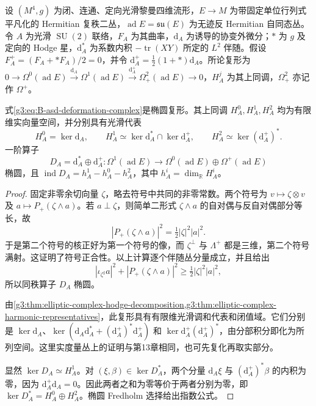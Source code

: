 \begin{proposition}\label{g3:prop:B-asd-elliptic-complex}
	设 \((M^4,g)\) 为闭、连通、定向光滑黎曼四维流形，\(E\to M\) 为带固定单位行列式平凡化的 Hermitian 复秩二丛，\(\operatorname{ad}E=\mathfrak{su}(E)\) 为无迹反 Hermitian 自同态丛。
	令 \(A\) 为光滑 \(\operatorname{SU}(2)\) 联络，\(F_A\) 为其曲率，\(\mathrm d_A\) 为诱导的协变外微分；\(*\) 为 \(g\) 及定向的 Hodge 星，\(\mathrm d_A^*\) 为系数内积 \(-\operatorname{tr}(XY)\) 所定的 \(L^2\) 伴随。假设 \(F_A^+=(F_A+*F_A)/2=0\)，并令 \(\mathrm d_A^+=\tfrac12(1+*)\mathrm d_A\)。所论复形为 \(0\to\Omega^0(\operatorname{ad}E)\xrightarrow{\mathrm d_A}\Omega^1(\operatorname{ad}E)\xrightarrow{\mathrm d_A^+}\Omega^2_+(\operatorname{ad}E)\to0\)，\(H_A^j\) 为其上同调，\(\Omega^2_+\) 亦记作 \(\Omega^+\)。

 式\eqref{g3:eq:B-asd-deformation-complex}是椭圆复形。其上同调 \(H_A^0,H_A^1,H_A^2\) 均为有限维实向量空间，并分别具有光滑代表
 \[
  H_A^0=\ker \mathrm d_A,
  \qquad H_A^1\simeq\ker \mathrm d_A^*\cap\ker \mathrm d_A^+,
  \qquad H_A^2\simeq\ker(\mathrm d_A^+)^*.
 \]
 一阶算子
 \[
  D_A=\mathrm d_A^*\oplus \mathrm d_A^+
  \colon\Omega^1(\operatorname{ad}E)
  \longrightarrow\Omega^0(\operatorname{ad}E)\oplus\Omega^+(\operatorname{ad}E)
 \]
 椭圆，且 \(\operatorname{ind}D_A=h_A^1-h_A^0-h_A^2\)，其中 \(h_A^i=\dim_{\mathbb R}H_A^i\)。
\end{proposition}
\begin{proof}
 固定非零余切向量 \(\zeta\)，略去符号中共同的非零常数。两个符号为
 \(v\mapsto\zeta\otimes v\) 及 \(a\mapsto P_+(\zeta\wedge a)\)。若 \(a\perp\zeta\)，则简单二形式 \(\zeta\wedge a\) 的自对偶与反自对偶部分等长，故
 \[
  |P_+(\zeta\wedge a)|^2=\tfrac12|\zeta|^2|a|^2.
 \]
 于是第二个符号的核正好为第一个符号的像，而 \(\zeta^\perp\) 与 \(\Lambda^+\) 都是三维，第二个符号满射。这证明了符号正合性。以上计算逐个伴随丛分量成立，并且给出
 \[
  |\iota_{\zeta^\sharp}a|^2+|P_+(\zeta\wedge a)|^2
  \ge\tfrac12|\zeta|^2|a|^2,
 \]
 所以同秩算子 \(D_A\) 椭圆。

 由\cref{g3:thm:elliptic-complex-hodge-decomposition,g3:thm:elliptic-complex-harmonic-representatives}，此复形具有有限维光滑调和代表和闭值域。它们分别是
 \(\ker \mathrm d_A\)、\(\ker(\mathrm d_A\mathrm d_A^*+(\mathrm d_A^+)^*\mathrm d_A^+)\) 和 \(\ker \mathrm d_A^+(\mathrm d_A^+)^*\)，由分部积分即化为所列空间。这里实度量丛上的证明与第13章相同，也可先复化再取实部分。

 显然 \(\ker D_A\simeq H_A^1\)。对 \((\xi,\beta)\in\ker D_A^*\)，两个分量 \(\mathrm d_A\xi\) 与 \((\mathrm d_A^+)^*\beta\) 的内积为零，因为 \(\mathrm d_A^+\mathrm d_A=0\)。因此两者之和为零等价于两者分别为零，即
 \(\ker D_A^*=H_A^0\oplus H_A^2\)。椭圆 Fredholm 选择给出指数公式。
\end{proof}

